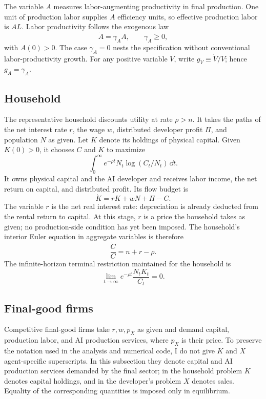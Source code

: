 The variable \(A\) measures labor-augmenting productivity in final production.
One unit of production labor supplies \(A\) efficiency units, so effective
production labor is \(AL\). Labor productivity follows the exogenous law
\begin{equation}
 \dot A=\gamma_A A,
 \qquad \gamma_A\geq0,
 \label{eq:axm-labor-productivity}
\end{equation}
with \(A(0)>0\). The case \(\gamma_A=0\) nests the specification without
conventional labor-productivity growth. For any positive variable \(V\), write
\(g_V\equiv\dot V/V\); hence \(g_A=\gamma_A\).

\subsection{Household}

The representative household discounts utility at rate \(\rho>n\). It takes the
paths of the net interest rate \(r\), the wage \(w\), distributed developer
profit \(\Pi\), and population \(N\) as given. Let \(K\) denote its holdings of
physical capital. Given \(K(0)>0\), it chooses \(C\) and \(K\) to maximize
\[
 \int_0^\infty e^{-\rho t}N_t\log(C_t/N_t)\,\dd t.
\]
It owns physical capital and the AI developer and receives labor income, the net
return on capital, and distributed profit. Its flow budget is
\begin{equation}
 \dot K=rK+wN+\Pi-C.
 \label{eq:axm-household-budget}
\end{equation}
The variable \(r\) is the net real interest rate: depreciation is already
deducted from the rental return to capital. At this stage, \(r\) is a price the
household takes as given; no production-side condition has yet been imposed. The
household's interior Euler equation in aggregate variables is therefore
\begin{equation}
 \frac{\dot C}{C}=n+r-\rho.
 \label{eq:axm-euler}
\end{equation}
The infinite-horizon terminal restriction maintained for the household is
\begin{equation}
 \lim_{t\to\infty}e^{-\rho t}\frac{N_tK_t}{C_t}=0.
 \label{eq:axm-household-tvc}
\end{equation}

\subsection{Final-good firms}

Competitive final-good firms take \(r,w,p_X\) as given and demand capital,
production labor, and AI production services, where \(p_X\) is their price. To
preserve the notation used in the analysis and numerical code, I do not give
\(K\) and \(X\) agent-specific superscripts. In this subsection they denote
capital and AI production services demanded by the final sector; in the
household problem \(K\) denotes capital holdings, and in the developer's problem
\(X\) denotes sales. Equality of the corresponding quantities is imposed only
in equilibrium.

